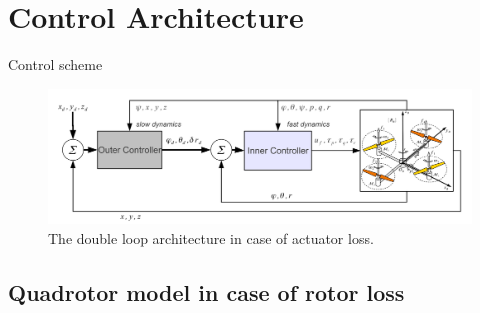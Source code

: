 \section{Control Architecture}

\begin{frame}{Control scheme}
	\begin{figure}
		\centering
		\includegraphics[width=1.0\linewidth]{Images/ControlScheme}
		\caption{The double loop architecture in case of actuator loss.}
		\label{fig:controlscheme}
	\end{figure}
\end{frame}

\subsection{Quadrotor model in case of rotor loss}

